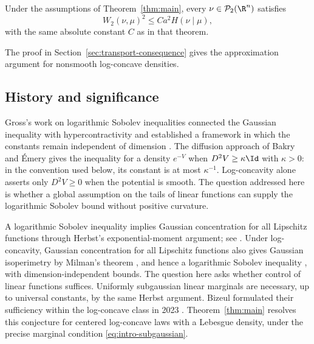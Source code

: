 \begin{corollary}
\label{cor:intro-transport}
Under the assumptions of Theorem~\ref{thm:main}, every
$\nu\in\mathcal P_2(\R^n)$ satisfies
\[
 W_2(\nu,\mu)^2\le Ca^2 H(\nu\mid\mu),
\]
with the same absolute constant $C$ as in that theorem.
\end{corollary}

The proof in Section~\ref{sec:transport-consequence} gives the
approximation argument for nonsmooth log-concave densities.

\subsection{History and significance}

Gross's work on logarithmic Sobolev inequalities connected the
Gaussian inequality with hypercontractivity and established a
framework in which the constants remain independent of dimension
\cite{Gross1975}.  The diffusion approach of Bakry and \'Emery
\cite{BakryEmery1985} gives the inequality for a density $e^{-V}$
when $D^2V\ge\kappa\Id$ with $\kappa>0$: in the convention used
below, its constant is at most $\kappa^{-1}$.
Log-concavity alone asserts only $D^2V\ge0$ when the potential is
smooth.  The question addressed here is whether a global assumption
on the tails of linear functions can supply the logarithmic Sobolev
bound without positive curvature.

A logarithmic Sobolev inequality implies Gaussian concentration for
all Lipschitz functions through Herbst's exponential-moment argument;
see \cite[Section~2.3]{Ledoux1999}.  Under log-concavity, Gaussian
concentration for all Lipschitz functions also gives Gaussian
isoperimetry by Milman's theorem \cite[Theorem~1.1]{Milman2010},
and hence a logarithmic Sobolev inequality
\cite[Lemma~3.3]{Bobkov1999}, with dimension-independent bounds.
The question here asks whether control of linear functions suffices.
Uniformly subgaussian linear marginals are necessary, up to universal
constants, by the same Herbst argument.
Bizeul formulated their sufficiency within the log-concave class in 2023
\cite[Conjecture~2]{Bizeul2026}.  Theorem~\ref{thm:main} resolves
this conjecture for centered log-concave laws with a Lebesgue density,
under the precise marginal condition
\eqref{eq:intro-subgaussian}.


